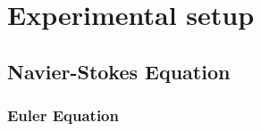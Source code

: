 \newpage
\chapter{Experimental setup}
\lipsum
\section{Navier-Stokes Equation}
\lipsum[1]
\subsection{Euler Equation}
\lipsum[2]
